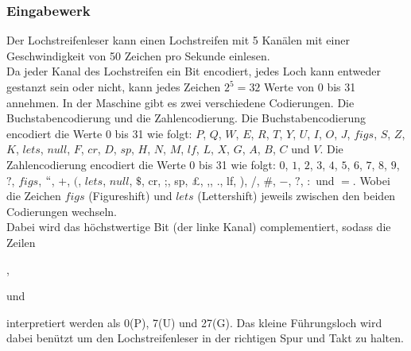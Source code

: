 \documentclass[12pt]{report}
\begin{document}
\subsubsection{Eingabewerk}
Der Lochstreifenleser kann einen Lochstreifen mit 5 Kanälen mit einer Geschwindigkeit von 50 Zeichen pro Sekunde einlesen.\\
Da jeder Kanal des Lochstreifen ein Bit encodiert, jedes Loch kann entweder gestanzt sein oder nicht, kann jedes Zeichen $2^5=32$ Werte von 0 bis 31 annehmen. In der Maschine gibt es zwei verschiedene Codierungen. Die Buchstabencodierung und die Zahlencodierung. Die Buchstabencodierung encodiert die Werte 0 bis 31 wie folgt: $P$, $Q$, $W$, $E$, $R$, $T$, $Y$, $U$, $I$, $O$, $J$, $figs$, $S$, $Z$, $K$, $lets$, $null$, $F$, $cr$, $D$, $sp$, $H$, $N$, $M$, $lf$, $L$, $X$, $G$, $A$, $B$, $C$ und $V$. Die Zahlencodierung encodiert die Werte 0 bis 31 wie folgt: $0$, $1$, $2$, $3$, $4$, $5$, $6$, $7$, $8$, $9$, $?$, $figs$, $``$, $+$, $($, $lets$, $null$, $\$$, cr, ;, sp, £, ,, ., lf, ), /, \#, $-$, $?$, $:$ und $=$.
Wobei die Zeichen $figs$ (Figureshift) und $lets$ (Lettershift) jeweils zwischen den beiden Codierungen wechseln. \\
Dabei wird das höchstwertige Bit (der linke Kanal) complementiert, sodass die Zeilen 
,
und
interpretiert werden als 0(P), 7(U) und 27(G). Das kleine Führungsloch wird dabei benützt um den Lochstreifenleser in der richtigen Spur und Takt zu halten.\\
\end{document}
